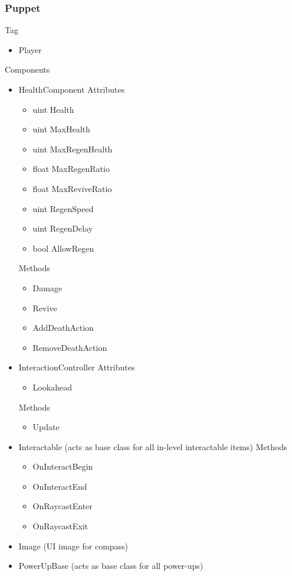 \documentclass[11pt]{article}
\begin{document}
\subsubsection{Puppet}
Tag
\begin{itemize}
\item Player
\end{itemize}
Components
\begin{itemize}
\item HealthComponent
\newline Attributes
\begin{itemize}
\item uint Health
\item uint MaxHealth
\item uint MaxRegenHealth
\item float MaxRegenRatio
\item float MaxReviveRatio
\item uint RegenSpeed
\item uint RegenDelay
\item bool AllowRegen
\end{itemize}
Methods
\begin{itemize}
\item Damage
\item Revive
\item AddDeathAction
\item RemoveDeathAction
\end{itemize}
\item InteractionController
\newline Attributes
\begin{itemize}
\item Lookahead
\end{itemize}
Methods
\begin{itemize}
\item Update
\end{itemize}
\item Interactable (acts as base class for all in-level interactable items)
\newline Methods
\begin{itemize}
\item OnInteractBegin
\item OnInteractEnd
\item OnRaycastEnter
\item OnRaycastExit
\end{itemize}
\item Image (UI image for compass)
\item PowerUpBase (acts as base class for all power-ups)

\end{itemize}
\end{document}
